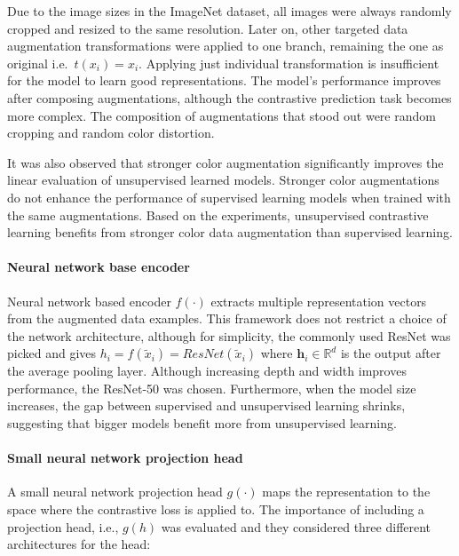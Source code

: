 \documentclass[
]{krantz}
\begin{document}
Due to the image sizes in the ImageNet dataset, all images were always randomly cropped and resized to the same resolution. Later on, other targeted data augmentation transformations were applied to one branch, remaining the one as original i.e.~\(t\left( x_{i}\right)= x_i\).
Applying just individual transformation is insufficient for the model to learn good representations. The model's performance improves after composing augmentations, although the contrastive prediction task becomes more complex. The composition of augmentations that stood out were random cropping and random color distortion.

It was also observed that stronger color augmentation significantly improves the linear evaluation of unsupervised learned models. Stronger color augmentations do not enhance the performance of supervised learning models when trained with the same augmentations. Based on the experiments, unsupervised contrastive learning benefits from stronger color data augmentation than supervised learning.

\hypertarget{neural-network-base-encoder}{%
\paragraph{Neural network base encoder}\label{neural-network-base-encoder}}

Neural network based encoder \(f\left( \cdot \right)\) extracts multiple representation vectors from the augmented data examples. This framework does not restrict a choice of the network architecture, although for simplicity, the commonly used ResNet was picked and gives \(h_i=f\left( \tilde{x}_{i} \right)=ResNet\left(\tilde{x}_{i}\right)\) where \(\textbf{h}_i\in \mathbb{R}^{d}\) is the output after the average pooling layer. Although increasing depth and width improves performance, the ResNet-50 was chosen. Furthermore, when the model size increases, the gap between supervised and unsupervised learning shrinks, suggesting that bigger models benefit more from unsupervised learning.

\hypertarget{small-neural-network-projection-head}{%
\paragraph{Small neural network projection head}\label{small-neural-network-projection-head}}

A small neural network projection head \(g\left( \cdot \right)\) maps the representation to the space where the contrastive loss is applied to. The importance of including a projection head, i.e., \(g\left( h \right)\) was evaluated and they considered three different architectures for the head:
\end{document}

